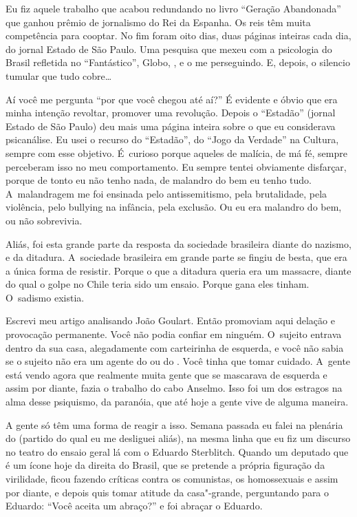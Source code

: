 Eu fiz aquele trabalho que acabou redundando no livro ``Geração
Abandonada'' que ganhou prêmio de jornalismo do Rei da Espanha. Os reis
têm muita competência para cooptar. No fim foram oito dias, duas páginas
inteiras cada dia, do jornal Estado de São Paulo. Uma pesquisa que mexeu
com a psicologia do Brasil refletida no ``Fantástico'',  Globo, ,
e o  me perseguindo. E, depois, o silencio tumular que tudo
cobre…

 

Aí você me pergunta ``por que você chegou até aí?'' É evidente e óbvio
que era minha intenção revoltar, promover uma revolução. Depois o
``Estadão'' (jornal Estado de São Paulo) deu mais uma página inteira
sobre o que eu considerava psicanálise. Eu usei o recurso do
``Estadão'', do ``Jogo da Verdade'' na  Cultura, sempre com esse
objetivo. É~curioso porque aqueles de malícia, de má fé, sempre
perceberam isso no meu comportamento. Eu sempre tentei obviamente
disfarçar, porque de tonto eu não tenho nada, de malandro do bem eu
tenho tudo. A~malandragem me foi ensinada pelo antissemitismo, pela
brutalidade, pela violência, pelo bullying na infância, pela exclusão.
Ou eu era malandro do bem, ou não sobrevivia.

 

Aliás, foi esta grande parte da resposta da sociedade brasileira diante
do nazismo, e da ditadura. A~sociedade brasileira em grande parte se
fingiu de besta, que era a única forma de resistir. Porque o que a
ditadura queria era um massacre, diante do qual o golpe no Chile teria
sido um ensaio. Porque gana eles tinham. O~sadismo existia.

 

Escrevi meu artigo analisando João Goulart. Então promoviam aqui delação
e provocação permanente. Você não podia confiar em ninguém. O~sujeito
entrava dentro da sua casa, alegadamente com carteirinha de esquerda, e
você não sabia se o sujeito não era um agente do  ou do . Você
tinha que tomar cuidado. A~gente está vendo agora que realmente muita
gente que se mascarava de esquerda e assim por diante, fazia o trabalho
do cabo Anselmo. Isso foi um dos estragos na alma desse psiquismo, da
paranóia, que até hoje a gente vive de alguma maneira.

 

A gente só têm uma forma de reagir a isso. Semana passada eu falei na
plenária do  (partido do qual eu me desliguei aliás), na mesma linha
que eu fiz um discurso no teatro do ensaio geral lá com o Eduardo
Sterblitch. Quando um deputado que é um ícone hoje da direita do Brasil,
que se pretende a própria figuração da virilidade, ficou fazendo
críticas contra os comunistas, os homossexuais e assim por diante, e
depois quis tomar atitude da casa"-grande, perguntando para o Eduardo:
``Você aceita um abraço?'' e foi abraçar o Eduardo.

